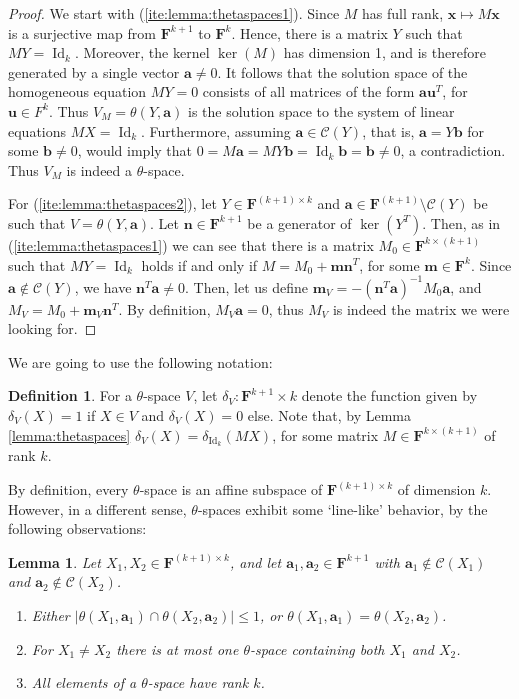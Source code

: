 \documentclass[11pt]{amsart}
\theoremstyle{plain}
\newtheorem{lemma}[thm]{Lemma}
\theoremstyle{definition}
\newtheorem{definition}[thm]{Definition}
\newcommand{\F}{{\mathbf F}}
\renewcommand\vec{\mathbf}
\newcommand{\va}{\vec{a}}
\newcommand{\vb}{\vec{b}}
\newcommand{\vn}{\vec{n}}
\newcommand{\vm}{\vec{m}}
\newcommand{\vu}{\vec{u}}
\newcommand{\vx}{\vec{x}}
\DeclareMathOperator{\Id}{Id}
\newcommand{\Col}[1]{\mathcal{C}(#1)}
\begin{document}
\begin{proof}
We start with (\ref{ite:lemma:thetaspaces1}). 
Since $M$ has full rank, $\vx \mapsto M \vx$ is a surjective map from $\F^{k+1}$ to $\F^k$. Hence, there is a matrix $Y$ such that $MY = \Id_k$. Moreover, the kernel $\ker (M)$ has dimension 1, and is therefore generated by a single vector $\va \neq 0$. It follows that the solution space of the homogeneous equation $MY = 0$ consists of all matrices of the form $\va \vu^T$, for $\vu \in F^k$. 
Thus $ V_M = \theta(Y,\va)$ is the solution space to the system of linear equations $MX = \Id_k$. Furthermore, assuming $\va \in\Col{Y}$, that is, $\va = Y\vb$ for some $\vb \neq 0$, would imply that $0 = M\va = MY \vb = \Id_k\vb = \vb \neq 0$, a contradiction. Thus $V_M$ is indeed a $\theta$-space.

For (\ref{ite:lemma:thetaspaces2}), let $Y \in \F^{(k+1) \times k}$ and $\va \in \F^{(k+1)}\setminus\Col{Y}$ be such that $V = \theta(Y,\va)$. Let $\vn \in \F^{k+1}$ be a generator of $\ker(Y^T)$. Then, as in (\ref{ite:lemma:thetaspaces1}) we can see that there is a matrix $M_0 \in \F^{k \times (k+1)}$ such that $M Y = \Id_k$ holds if and only if $M = M_0 + \vm \vn^T$, for some $\vm \in \F^{k}$. Since $\va \notin \Col{Y}$, we have $ \vn^T\va \neq 0$. Then, let us define $\vm_V = - (\vn^T\va)^{-1}M_0\va$, and $M_V =  M_0 + \vm_V \vn^T$. By definition, $M_V \va = 0$, thus $M_V$ is indeed the matrix we were looking for.
\end{proof}

We are going to use the following notation:

\begin{definition} \label{definition:deltaV}
For a $\theta$-space $V$, let $\delta_V \colon \F^{k+1}\times k$ denote the function given by $\delta_V(X) = 1$ if $X \in V$ and $\delta_V(X) = 0$ else. Note that, by Lemma \ref{lemma:thetaspaces}
$\delta_{V}(X) = \delta_{\Id_k}(MX)$, for some matrix $M \in \F^{k\times (k+1)}$ of rank $k$.
\end{definition}

By definition, every $\theta$-space is an affine subspace of $\F^{(k+1)\times k}$ of dimension $k$. However, in a different sense, $\theta$-spaces 
exhibit some `line-like' behavior, by the following observations:

\begin{lemma} \label{lem:thetaspaces} 
Let $X_1, X_2\in \F^{(k+1) \times k}$, and let $\va_1, \va_2\in \F^{k+1}$ with $\va_1\notin \Col{X_1}$ and $\va_2\notin \Col{X_2}$.
\begin{enumerate}
\item \label{ite:lem:thetaspaces1} Either $|\theta(X_1,\va_1) \cap \theta(X_2,\va_2)| \leq 1$, or $\theta(X_1,\va_1) = \theta(X_2,\va_2)$.
\item \label{ite:lem:thetaspaces2} For $X_1 \neq X_2$ there is at most one $\theta$-space containing both $X_1$ and $X_2$.
\item \label{ite:lem:thetaspaces3} All elements of a $\theta$-space have rank $k$.
\end{enumerate}
\end{lemma}
\end{document}
